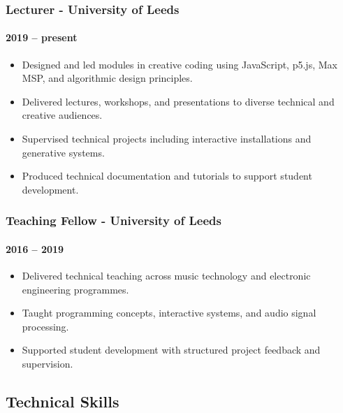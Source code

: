 \documentclass[11pt,a4paper]{article}
\providecommand{\tightlist}{%
  \setlength{\itemsep}{0pt}\setlength{\parskip}{0pt}}
\begin{document}
\subsubsection{Lecturer - University of
Leeds}\label{lecturer---university-of-leeds}

\paragraph{2019 -- present}\label{present}

\begin{itemize}
\tightlist
\item
  Designed and led modules in creative coding using JavaScript, p5.js,
  Max MSP, and algorithmic design principles.
\item
  Delivered lectures, workshops, and presentations to diverse technical
  and creative audiences.
\item
  Supervised technical projects including interactive installations and
  generative systems.
\item
  Produced technical documentation and tutorials to support student
  development.
\end{itemize}

\subsubsection{Teaching Fellow - University of
Leeds}\label{teaching-fellow---university-of-leeds}

\paragraph{2016 -- 2019}\label{section}

\begin{itemize}
\tightlist
\item
  Delivered technical teaching across music technology and electronic
  engineering programmes.
\item
  Taught programming concepts, interactive systems, and audio signal
  processing.
\item
  Supported student development with structured project feedback and
  supervision.
\end{itemize}

\subsection{Technical Skills}\label{technical-skills}
\end{document}
